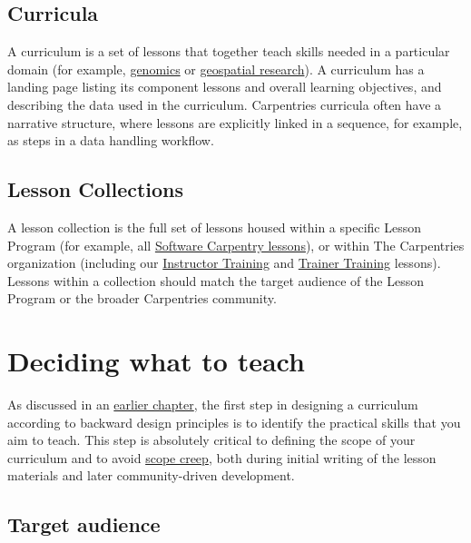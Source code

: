 \documentclass[]{book}
\begin{document}
\hypertarget{curricula}{%
\section{Curricula}\label{curricula}}

A curriculum is a set of lessons that together teach skills needed in a particular
domain (for example, \href{https://datacarpentry.org/genomics-workshop/}{genomics} or
\href{https://datacarpentry.org/geospatial-workshop/}{geospatial research}). A curriculum has a
landing page listing its component lessons and overall learning objectives, and describing
the data used in the curriculum. Carpentries curricula often have a narrative structure,
where lessons are explicitly linked in a sequence, for example, as steps in a data handling
workflow.

\hypertarget{lesson-collections}{%
\section{Lesson Collections}\label{lesson-collections}}

A lesson collection is the full set of lessons housed within
a specific Lesson Program (for example, all \href{https://software-carpentry.org/lessons/}{Software Carpentry lessons}), or
within The Carpentries organization (including our \href{https://carpentries.github.io/instructor-training/}{Instructor Training} and
\href{https://carpentries.github.io/trainer-training/}{Trainer Training} lessons).
Lessons within a collection should match the target audience of the Lesson Program or
the broader Carpentries community.

\hypertarget{deciding-what-to-teach}{%
\chapter{Deciding what to teach}\label{deciding-what-to-teach}}

As discussed in an \href{https://carpentries.github.io/curriculum-development/conceptual-elements.html\#backward-design}{earlier chapter}, the first step in designing a curriculum according to backward design principles is to
identify the practical skills that you aim to teach. This step is absolutely critical to defining the scope of
your curriculum and to avoid \href{https://en.wikipedia.org/wiki/Scope_creep}{scope creep}, both during initial writing of the lesson materials and later
community-driven development.

\hypertarget{target-audience}{%
\section{Target audience}\label{target-audience}}
\end{document}
